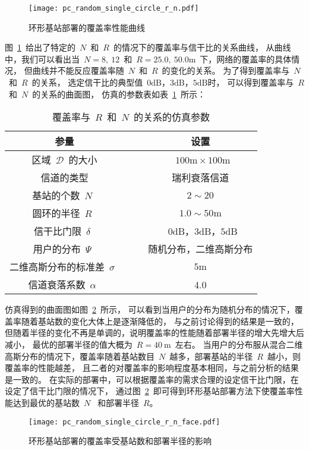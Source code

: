 \begin{figure}[htbp]
\centering
\texttt{[image: pc\_random\_single\_circle\_r\_n.pdf]}
\caption{环形基站部署的覆盖率性能曲线}\vspace{-0.5em}
\label{pc_random_single_circle_r_n}
\end{figure}

图~\ref{pc_random_single_circle_r_n}~给出了特定的~$N$~和~$R$~的情况下的覆盖率与信干比的关系曲线，
从曲线中，我们可以看出当~$N=8, ~12$~和~$R=25.0,~50.0\mathrm{m}$~下，网络的覆盖率的具体情况，
但曲线并不能反应覆盖率随~$N$~和~$R$~的变化的关系。
为了得到覆盖率与~$N$~和~$R$~的关系，
选定信干比的典型值~$0\mathrm{dB}$，$3\mathrm{dB}$，$5\mathrm{dB}$时，
可以得到覆盖率与~$R$~和~$N$~的关系的曲面图，
仿真的参数表如表~\ref{pc_random_single_circle_r_n_table}~所示：

\begin{table}[htbp]
\caption{覆盖率与~$R$~和~$N$~的关系的仿真参数}
\label{pc_random_single_circle_r_n_table}
\vspace{0.5em}\centering\wuhao
\begin{tabular}{cccc}
\toprule[1.5pt]
参量 & & & 设置 \\
\midrule[0.5pt]
区域~$\mathcal{D}$~的大小  & & & ~$100\mathrm{m} \times 100 \mathrm{m}$ \\
信道的类型 & & &  瑞利衰落信道\\
基站的个数~$N$~ & & &  $2\sim20$\\
圆环的半径~$R$~ & & &  $1.0\sim 50\mathrm{m}$\\
信干比门限~$\delta$~  & & & ~$0\mathrm{dB}$，$3\mathrm{dB}$，$5\mathrm{dB}$\\
用户的分布~$\Psi$~ & & & 随机分布，二维高斯分布\\
二维高斯分布的标准差~$\sigma$~ & & & ${5\mathrm{m}}$\\
信道衰落系数~$\alpha$~  & & & 4.0\\
\bottomrule[1.5pt]
\end{tabular}
\end{table}

仿真得到的曲面图如图~\ref{pc_random_single_circle_r_n_face}~所示，
可以看到当用户的分布为随机分布的情况下，覆盖率随着基站数的变化大体上是逐渐降低的，
与之前讨论得到的结果是一致的，但随着半径的变化不再是单调的，说明覆盖率的性能随着部署半径的增大先增大后减小，
最优的部署半径的值大概为~$R = 40~\mathrm{m}$~左右。
当用户的分布服从混合二维高斯分布的情况下，覆盖率随着基站数目~$N$~越多，部署基站的半径~$R$~越小，则覆盖率的性能越差，
且二者的对覆盖率的影响程度基本相同，与之前分析的结果是一致的。
在实际的部署中，可以根据覆盖率的需求合理的设定信干比门限，在设定了信干比门限的情况下，
通过图~\ref{pc_random_single_circle_r_n_face}~即可得到环形基站部署方法下使覆盖率性能达到最优的基站数~$N$~
和部署半径~$R$。
\begin{figure}[htbp]
\centering
\texttt{[image: pc\_random\_single\_circle\_r\_n\_face.pdf]}
\caption{环形基站部署的覆盖率受基站数和部署半径的影响}\vspace{-0.5em}
\label{pc_random_single_circle_r_n_face}
\end{figure}


